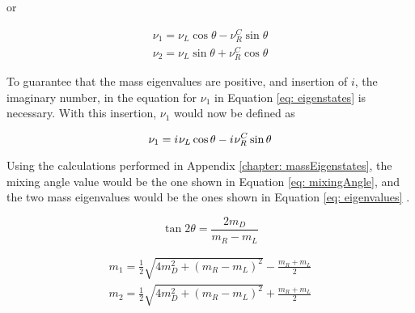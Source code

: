 or

\begin{equation} \label{eq: eigenstates}
\begin{split}										
\nu_{1} = \nu_{L} \cos \theta - \nu_{R}^{C} \sin \theta \\
\nu_{2} = \nu_{L} \sin \theta + \nu_{R}^{C} \cos \theta											
\end{split}
\end{equation}

To guarantee that the mass eigenvalues are positive, and insertion of $i$, the imaginary number, in the equation for $\nu_{1}$ in Equation \ref{eq: eigenstates} is necessary. With this insertion, $\nu_{1}$ would now be defined as

$$ \nu_{1} = {i\mkern1mu} \nu_{L} \cos \theta - {i\mkern1mu} \nu_{R}^{C} \sin \theta $$

Using the calculations performed in Appendix \ref{chapter: massEigenstates}, the mixing angle value would be the one shown in Equation \ref{eq: mixingAngle}, and the two mass eigenvalues would be the ones shown in Equation \ref{eq: eigenvalues} \cite{NeutrinoMass}.

\begin{equation}\label{eq: mixingAngle}
\tan 2\theta = \frac{2m_{D}}{m_{R}-m_{L}}
\end{equation}

\begin{equation}\label{eq: eigenvalues}
\begin{split}
m_{1} = \frac{1}{2}\sqrt{4m_{D}^{2} + \left(m_{R} - m_{L}\right)^{2}} - \frac{m_{R} + m_{L}}{2} \\
m_{2} = \frac{1}{2}\sqrt{4m_{D}^{2} + \left(m_{R} - m_{L}\right)^{2}} + \frac{m_{R} + m_{L}}{2}
\end{split}
\end{equation}

